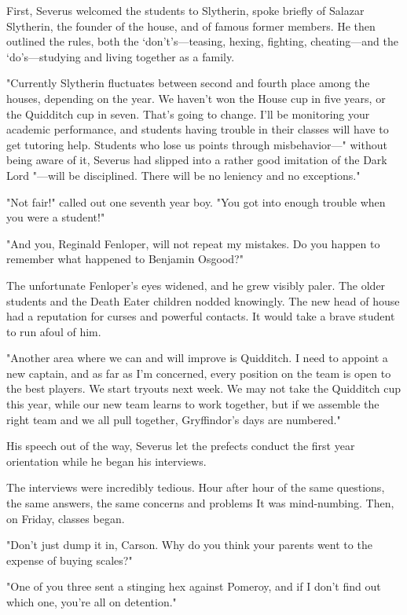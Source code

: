 First, Severus welcomed the students to Slytherin, spoke briefly of Salazar Slytherin, the founder of the house, and of famous former members. He then outlined the rules, both the `don't's—teasing, hexing, fighting, cheating—and the `do's—studying and living together as a family.

"Currently Slytherin fluctuates between second and fourth place among the houses, depending on the year. We haven't won the House cup in five years, or the Quidditch cup in seven. That's going to change. I'll be monitoring your academic performance, and students having trouble in their classes will have to get tutoring help. Students who lose us points through misbehavior—" without being aware of it, Severus had slipped into a rather good imitation of the Dark Lord "—will be{\el} disciplined. There will be no leniency and no exceptions."

"Not fair!" called out one seventh year boy. "You got into enough trouble when you were a student!"

"And you, Reginald Fenloper, will not repeat my mistakes. Do you happen to remember what happened to Benjamin Osgood?"

The unfortunate Fenloper's eyes widened, and he grew visibly paler. The older students and the Death Eater children nodded knowingly. The new head of house had a reputation for curses and powerful contacts. It would take a brave student to run afoul of him.

"Another area where we can and will improve is Quidditch. I need to appoint a new captain, and as far as I'm concerned, every position on the team is open to the best players. We start tryouts next week. We may not take the Quidditch cup this year, while our new team learns to work together, but if we assemble the right team and we all pull together, Gryffindor's days are numbered."

His speech out of the way, Severus let the prefects conduct the first year orientation while he began his interviews.

The interviews were incredibly tedious. Hour after hour of the same questions, the same answers, the same concerns and problems{\el} It was mind-numbing. Then, on Friday, classes began.

"Don't just dump it in, Carson. Why do you think your parents went to the expense of buying scales?"

"One of you three sent a stinging hex against Pomeroy, and if I don't find out which one, you're all on detention."


